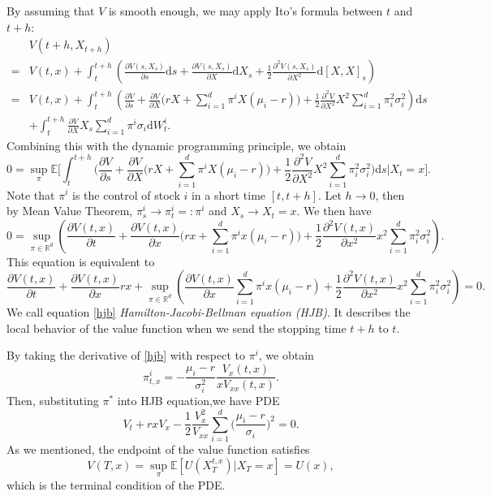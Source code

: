 \documentclass[a4paper]{article}
\theoremstyle{definition}
\numberwithin{equation}{section}
\begin{document}
By assuming that $V$ is smooth enough, we may apply Ito's formula between $t$ and $t+h$:
\begin{equation}\label{ito}
\begin{aligned}
&V(t+h,X_{t+h})\\
=&V(t,x)+\int^{t+h}_t\left(\frac{\partial V(s,X_s)}{\partial s}\mathrm ds+\frac{\partial V(s,X_s)}{\partial X}\mathrm dX_s+\frac{1}{2}\frac{\partial^2V(s,X_s)}{\partial X^2}\mathrm d[X,X]_s\right)\\
=&V(t,x)+\int^{t+h}_t\left(\frac{\partial V}{\partial s}+\frac{\partial V}{\partial X}\Big(rX+\sum^d_{i=1}\pi^iX(\mu_i-r)\Big)+\frac{1}{2}\frac{\partial^2V}{\partial X^2}X^2\sum^d_{i=1}\pi^2_i\sigma^2_i\right)\mathrm ds\\
&+\int^{t+h}_t\frac{\partial V}{\partial X}X_s\sum^d_{i=1}\pi^i\sigma_i\mathrm dW^i_t.
\end{aligned}
\end{equation}
Combining this with the dynamic programming principle, we obtain
$$0=\sup_\pi\mathbb E\bigg[\int^{t+h}_t\bigg(\frac{\partial V}{\partial s}+\frac{\partial V}{\partial X}\Big(rX+\sum^d_{i=1}\pi^iX(\mu_i-r)\Big)+\frac{1}{2}\frac{\partial^2V}{\partial X^2}X^2\sum^d_{i=1}\pi_i^2\sigma^2_i\bigg)\mathrm ds\bigg\lvert X_t=x\bigg].$$
Note that $\pi^i$ is the control of stock $i$ in a short time $[t,t+h]$. Let $h\rightarrow0$, then by Mean Value Theorem, $\pi^i_s\rightarrow\pi^i_t=:\pi^i$ and $X_s\rightarrow X_t=x$. We then have
$$0=\sup_{\pi\in\mathbb R^d}\left(\frac{\partial V(t,x)}{\partial t}+\frac{\partial V(t,x)}{\partial x}\Big(rx+\sum^d_{i=1}\pi^ix(\mu_i-r)\Big)+\frac{1}{2}\frac{\partial^2V(t,x)}{\partial x^2}x^2\sum^d_{i=1}\pi_i^2\sigma^2_i\right).$$
This equation is equivalent to
\begin{equation}\label{hjb}
\frac{\partial V(t,x)}{\partial t}+\frac{\partial V(t,x)}{\partial x}rx+\sup_{\pi\in\mathbb R^d}\left(\frac{\partial V(t,x)}{\partial x}\sum^d_{i=1}\pi^ix(\mu_i-r)+\frac{1}{2}\frac{\partial^2V(t,x)}{\partial x^2}x^2\sum^d_{i=1}\pi_i^2\sigma^2_i\right)=0.
\end{equation}
We call equation \eqref{hjb} \emph{Hamilton-Jacobi-Bellman equation (HJB)}. It describes the local behavior of the value function when we send the stopping time $t+h$ to $t$.

By taking the derivative of \eqref{hjb} with respect to $\pi^i$, we obtain
\begin{equation}\label{pi}
\pi^i_{t,x}=-\frac{\mu_i-r}{\sigma_i^2}\frac{V_x(t,x)}{xV_{xx}(t,x)}.
\end{equation}
Then, substituting $\pi^*$ into HJB
equation,we have PDE
$$V_t+rxV_x-\frac{1}{2}\frac{V^2_x}{V_{xx}}\sum^d_{i=1}\Big(\frac{\mu_i-r}{\sigma_i}\Big)^2=0.$$
As we mentioned, the endpoint of the value function satisfies
$$V(T,x)=\sup_\pi\mathbb E[U(X^{t,x}_T)\lvert X_T=x]=U(x),$$
which is the terminal condition of the PDE.
\end{document}

